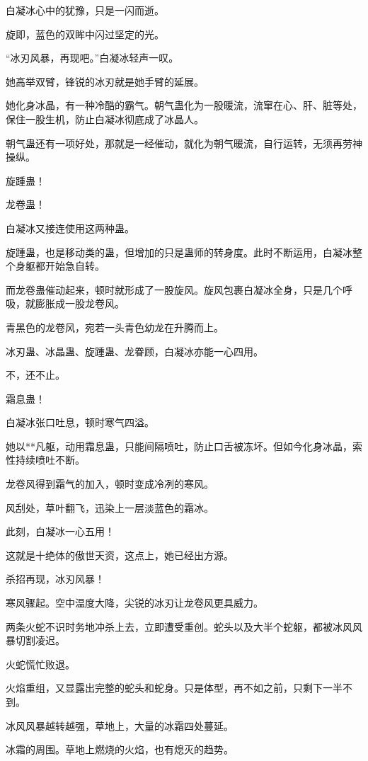
\begin{this_body}

白凝冰心中的犹豫，只是一闪而逝。

旋即，蓝色的双眸中闪过坚定的光。

“冰刃风暴，再现吧。”白凝冰轻声一叹。

她高举双臂，锋锐的冰刃就是她手臂的延展。

她化身冰晶，有一种冷酷的霸气。朝气蛊化为一股暖流，流窜在心、肝、脏等处，保住一股生机，防止白凝冰彻底成了冰晶人。

朝气蛊还有一项好处，那就是一经催动，就化为朝气暖流，自行运转，无须再劳神操纵。

旋踵蛊！

龙卷蛊！

白凝冰又接连使用这两种蛊。

旋踵蛊，也是移动类的蛊，但增加的只是蛊师的转身度。此时不断运用，白凝冰整个身躯都开始急自转。

而龙卷蛊催动起来，顿时就形成了一股旋风。旋风包裹白凝冰全身，只是几个呼吸，就膨胀成一股龙卷风。

青黑色的龙卷风，宛若一头青色幼龙在升腾而上。

冰刃蛊、冰晶蛊、旋踵蛊、龙眷顾，白凝冰亦能一心四用。

不，还不止。

霜息蛊！

白凝冰张口吐息，顿时寒气四溢。

她以**凡躯，动用霜息蛊，只能间隔喷吐，防止口舌被冻坏。但如今化身冰晶，索性持续喷吐不断。

龙卷风得到霜气的加入，顿时变成冷冽的寒风。

风刮处，草叶翻飞，迅染上一层淡蓝色的霜冰。

此刻，白凝冰一心五用！

这就是十绝体的傲世天资，这点上，她已经出方源。

杀招再现，冰刃风暴！

寒风骤起。空中温度大降，尖锐的冰刃让龙卷风更具威力。

两条火蛇不识时务地冲杀上去，立即遭受重创。蛇头以及大半个蛇躯，都被冰风风暴切割凌迟。

火蛇慌忙败退。

火焰重组，又显露出完整的蛇头和蛇身。只是体型，再不如之前，只剩下一半不到。

冰风风暴越转越强，草地上，大量的冰霜四处蔓延。

冰霜的周围。草地上燃烧的火焰，也有熄灭的趋势。


\end{this_body}
